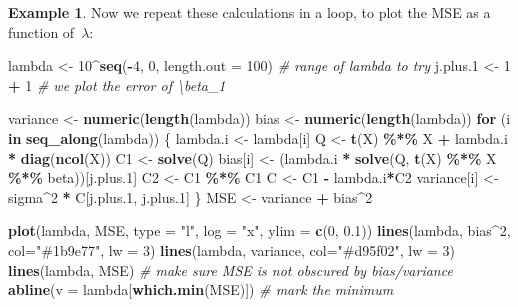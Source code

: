 \documentclass[
  a4paper,
]{article}
\newenvironment{Shaded}{\begin{snugshade}}{\end{snugshade}}
\newcommand{\AttributeTok}[1]{\textcolor[rgb]{0.13,0.29,0.53}{#1}}
\newcommand{\CommentTok}[1]{\textcolor[rgb]{0.56,0.35,0.01}{\textit{#1}}}
\newcommand{\ControlFlowTok}[1]{\textcolor[rgb]{0.13,0.29,0.53}{\textbf{#1}}}
\newcommand{\DecValTok}[1]{\textcolor[rgb]{0.00,0.00,0.81}{#1}}
\newcommand{\FloatTok}[1]{\textcolor[rgb]{0.00,0.00,0.81}{#1}}
\newcommand{\FunctionTok}[1]{\textcolor[rgb]{0.13,0.29,0.53}{\textbf{#1}}}
\newcommand{\NormalTok}[1]{#1}
\newcommand{\OtherTok}[1]{\textcolor[rgb]{0.56,0.35,0.01}{#1}}
\newcommand{\SpecialCharTok}[1]{\textcolor[rgb]{0.81,0.36,0.00}{\textbf{#1}}}
\newcommand{\StringTok}[1]{\textcolor[rgb]{0.31,0.60,0.02}{#1}}
\theoremstyle{definition}
\theoremstyle{definition}
\newtheorem{example}{Example}[section]
\theoremstyle{definition}
\theoremstyle{definition}
\theoremstyle{remark}
\begin{document}
\begin{example}
Now we repeat these calculations in a loop, to plot the MSE
as a function of~\(\lambda\):

\begin{Shaded}
\begin{Highlighting}[]
\NormalTok{lambda }\OtherTok{\textless{}{-}} \DecValTok{10}\SpecialCharTok{\^{}}\FunctionTok{seq}\NormalTok{(}\SpecialCharTok{{-}}\DecValTok{4}\NormalTok{, }\DecValTok{0}\NormalTok{, }\AttributeTok{length.out =} \DecValTok{100}\NormalTok{) }\CommentTok{\# range of lambda to try}
\NormalTok{j.plus}\FloatTok{.1} \OtherTok{\textless{}{-}} \DecValTok{1} \SpecialCharTok{+} \DecValTok{1} \CommentTok{\# we plot the error of \textbackslash{}beta\_1}

\NormalTok{variance }\OtherTok{\textless{}{-}} \FunctionTok{numeric}\NormalTok{(}\FunctionTok{length}\NormalTok{(lambda))}
\NormalTok{bias }\OtherTok{\textless{}{-}} \FunctionTok{numeric}\NormalTok{(}\FunctionTok{length}\NormalTok{(lambda))}
\ControlFlowTok{for}\NormalTok{ (i }\ControlFlowTok{in} \FunctionTok{seq\_along}\NormalTok{(lambda)) \{}
\NormalTok{    lambda.i }\OtherTok{\textless{}{-}}\NormalTok{ lambda[i]}
\NormalTok{    Q }\OtherTok{\textless{}{-}} \FunctionTok{t}\NormalTok{(X) }\SpecialCharTok{\%*\%}\NormalTok{ X }\SpecialCharTok{+}\NormalTok{ lambda.i }\SpecialCharTok{*} \FunctionTok{diag}\NormalTok{(}\FunctionTok{ncol}\NormalTok{(X))}
\NormalTok{    C1 }\OtherTok{\textless{}{-}} \FunctionTok{solve}\NormalTok{(Q)}
\NormalTok{    bias[i] }\OtherTok{\textless{}{-}}\NormalTok{ (lambda.i }\SpecialCharTok{*} \FunctionTok{solve}\NormalTok{(Q, }\FunctionTok{t}\NormalTok{(X) }\SpecialCharTok{\%*\%}\NormalTok{ X }\SpecialCharTok{\%*\%}\NormalTok{ beta))[j.plus}\FloatTok{.1}\NormalTok{]}
\NormalTok{    C2 }\OtherTok{\textless{}{-}}\NormalTok{ C1 }\SpecialCharTok{\%*\%}\NormalTok{ C1}
\NormalTok{    C }\OtherTok{\textless{}{-}}\NormalTok{ C1 }\SpecialCharTok{{-}}\NormalTok{ lambda.i}\SpecialCharTok{*}\NormalTok{C2}
\NormalTok{    variance[i] }\OtherTok{\textless{}{-}}\NormalTok{ sigma}\SpecialCharTok{\^{}}\DecValTok{2} \SpecialCharTok{*}\NormalTok{ C[j.plus}\FloatTok{.1}\NormalTok{, j.plus}\FloatTok{.1}\NormalTok{]}
\NormalTok{\}}
\NormalTok{MSE }\OtherTok{\textless{}{-}}\NormalTok{ variance }\SpecialCharTok{+}\NormalTok{ bias}\SpecialCharTok{\^{}}\DecValTok{2}

\FunctionTok{plot}\NormalTok{(lambda, MSE, }\AttributeTok{type =} \StringTok{"l"}\NormalTok{, }\AttributeTok{log =} \StringTok{"x"}\NormalTok{, }\AttributeTok{ylim =} \FunctionTok{c}\NormalTok{(}\DecValTok{0}\NormalTok{, }\FloatTok{0.1}\NormalTok{))}
\FunctionTok{lines}\NormalTok{(lambda, bias}\SpecialCharTok{\^{}}\DecValTok{2}\NormalTok{, }\AttributeTok{col=}\StringTok{"\#1b9e77"}\NormalTok{, }\AttributeTok{lw =} \DecValTok{3}\NormalTok{)}
\FunctionTok{lines}\NormalTok{(lambda, variance, }\AttributeTok{col=}\StringTok{"\#d95f02"}\NormalTok{, }\AttributeTok{lw =} \DecValTok{3}\NormalTok{)}
\FunctionTok{lines}\NormalTok{(lambda, MSE) }\CommentTok{\# make sure MSE is not obscured by bias/variance}
\FunctionTok{abline}\NormalTok{(}\AttributeTok{v =}\NormalTok{ lambda[}\FunctionTok{which.min}\NormalTok{(MSE)]) }\CommentTok{\# mark the minimum}


\end{Highlighting}
\end{Shaded}
\end{example}
\end{document}
